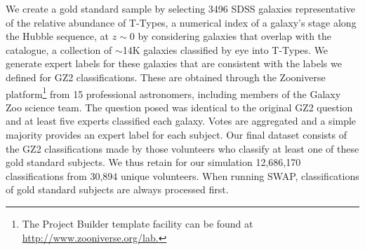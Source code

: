 We create a gold standard sample by selecting 3496 SDSS galaxies representative 
of the relative abundance of T-Types, a numerical index of a galaxy's stage along 
the Hubble sequence, at $z\sim0$ by considering galaxies that overlap 
with the~\cite{NairAbraham2010} catalogue, a collection of $\sim$14K galaxies 
classified by eye into T-Types. 
{We generate expert labels for these galaxies that are consistent with the labels we defined for GZ2 classifications. These are obtained} 
through the Zooniverse platform\footnote{The Project Builder template facility can be found at \url{http://www.zooniverse.org/lab.}}  
from 15 professional astronomers, including members of the Galaxy Zoo science team. 
 The question posed was identical to the original  GZ2 question 
and at least five experts classified each galaxy. 
Votes are aggregated and a simple majority provides an expert label for each subject. 
Our final dataset consists of the GZ2 classifications made 
by those volunteers who classify at least one of these gold standard subjects. 
We thus retain for our simulation 12,686,170 classifications from 30,894 unique volunteers. 
When running SWAP, classifications of gold standard subjects are always processed first. 




